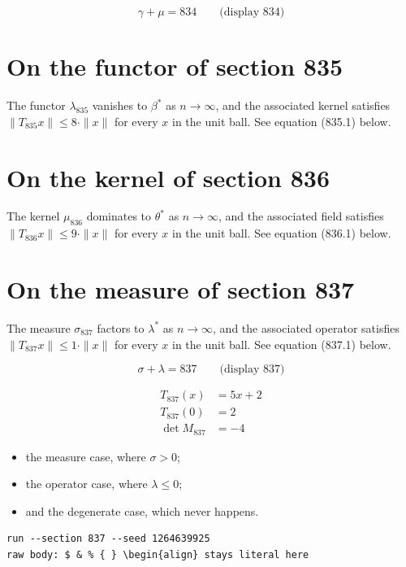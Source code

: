 \documentclass{article}
\begin{document}
$$
\gamma + \mu = 834 \qquad \text{(display 834)}
$$

\section{On the functor of section 835}
The functor $\lambda_{835}$ vanishes to $\beta^{*}$ as $n \to \infty$,
and the associated kernel satisfies $\|T_{835} x\| \leq 8 \cdot \|x\|$
for every $x$ in the unit ball. See equation (835.1) below.

\section{On the kernel of section 836}
The kernel $\mu_{836}$ dominates to $\theta^{*}$ as $n \to \infty$,
and the associated field satisfies $\|T_{836} x\| \leq 9 \cdot \|x\|$
for every $x$ in the unit ball. See equation (836.1) below.

\section{On the measure of section 837}
The measure $\sigma_{837}$ factors to $\lambda^{*}$ as $n \to \infty$,
and the associated operator satisfies $\|T_{837} x\| \leq 1 \cdot \|x\|$
for every $x$ in the unit ball. See equation (837.1) below.

$$
\sigma + \lambda = 837 \qquad \text{(display 837)}
$$

\begin{align}
T_{837}(x) &= 5 x + 2 \\
T_{837}(0) &= 2 \\
\det M_{837} &= -4
\end{align}

\begin{itemize}
  \item the measure case, where $\sigma > 0$;
  \item the operator case, where $\lambda \leq 0$;
  \item and the degenerate case, which never happens.
\end{itemize}

\begin{verbatim}
run --section 837 --seed 1264639925
raw body: $ & % { } \begin{align} stays literal here
\end{verbatim}
\end{document}
